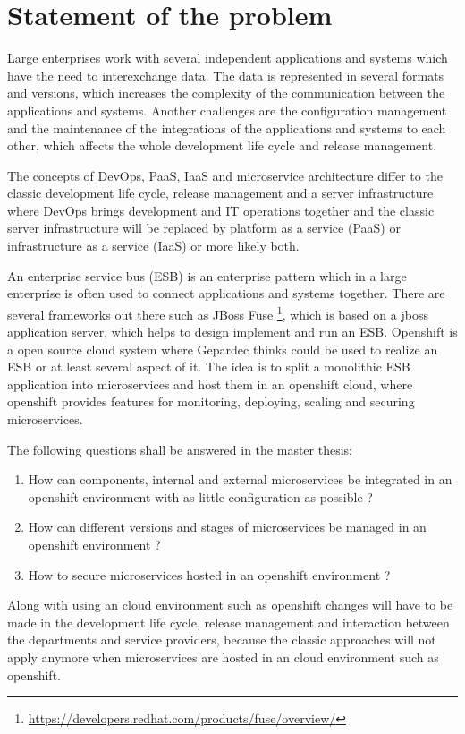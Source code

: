 \section{Statement of the problem}
Large enterprises work with several independent applications and systems which have the need to interexchange data. The data is represented in several formats and versions, which increases the complexity of the communication between the applications and systems. Another challenges are the configuration management and the maintenance of the integrations of the applications and systems to each other, which affects the whole development life cycle and release management.

The concepts of DevOps, PaaS, IaaS and microservice architecture differ to the classic development life cycle, release management and a server infrastructure where DevOps brings development and IT operations together and the classic server infrastructure will be replaced by platform as a service (PaaS) or infrastructure as a service (IaaS) or more likely both. 

An enterprise service bus (ESB) is an enterprise pattern which in a large enterprise is often used to connect applications and systems together. There are several frameworks out there such as JBoss Fuse \footnote{\url{https://developers.redhat.com/products/fuse/overview/}}, which is based on a jboss application server, which helps to design implement and run an ESB. Openshift is a open source cloud system where Gepardec thinks could be used to realize an ESB or at least several aspect of it. The idea is to split a monolithic ESB application into microservices and host them in an openshift cloud, where openshift provides features for monitoring, deploying, scaling and securing microservices.

The following questions shall be answered in the master thesis:
\begin{enumerate}
	\item How can components, internal and external microservices be integrated in an openshift environment with as little configuration as possible ?
	\item How can different versions and stages of microservices be managed in an openshift environment ?
	\item How to secure microservices hosted in an openshift environment ?
\end{enumerate}
Along with using an cloud environment such as openshift changes will have to be made in the development life cycle, release management and interaction between the departments and service providers, because the classic approaches will not apply anymore when microservices are hosted in an cloud environment such as openshift.

